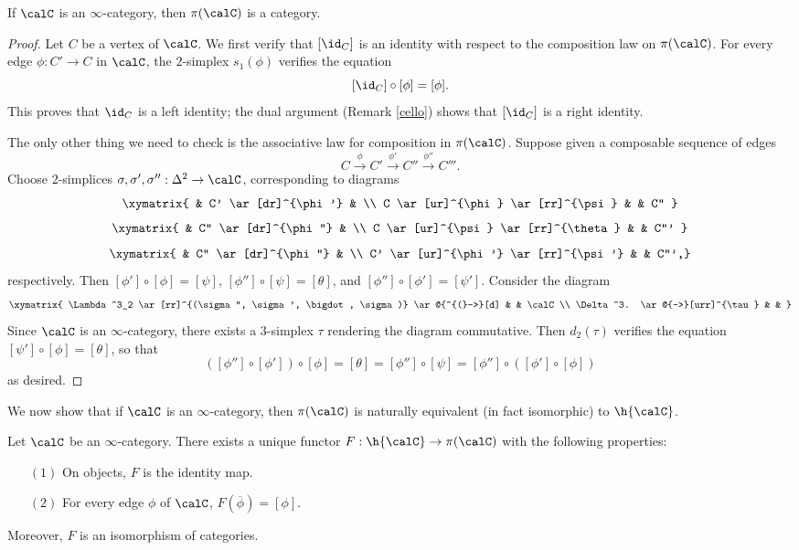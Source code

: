 \begin{proposition}
If $\calC$ is an $\infty$-category, then $\pi(\calC)$ is a category.
\end{proposition}

\begin{proof}
Let $C$ be a vertex of $\calC$. We first verify that $[\id_{C}]$ is an identity with respect to the composition law on $\pi(\calC)$. For every edge $\phi: C' \rightarrow C$ in $\calC$, the
$2$-simplex $s_1(\phi)$ verifies the equation
$$ [ \id_{C} ] \circ [\phi] = [\phi].$$
This proves that $\id_{C}$ is a left
identity; the dual argument (Remark \ref{cello}) shows that $[\id_{C}]$ is a right
identity.

The only other thing we need to check is the associative law for
composition in $\pi(\calC)$. Suppose given a composable sequence of edges
$$ C \stackrel{\phi}{\rightarrow} C' \stackrel{\phi'}{\rightarrow} C'' \stackrel{\phi''}{\rightarrow} C'''.$$
Choose $2$-simplices $\sigma, \sigma', \sigma'': \Delta^2 \rightarrow \calC$, corresponding to diagrams
$$ \xymatrix{ & C' \ar[dr]^{\phi'} & \\
C \ar[ur]^{\phi} \ar[rr]^{\psi} & & C'' }$$
$$ \xymatrix{ & C'' \ar[dr]^{\phi''} & \\
C \ar[ur]^{\psi} \ar[rr]^{\theta} & & C''' }$$
$$ \xymatrix{ & C'' \ar[dr]^{\phi''} & \\
C' \ar[ur]^{\phi'} \ar[rr]^{\psi'} & & C''',}$$
respectively. Then $[\phi'] \circ [\phi] = [\psi]$, $[\phi''] \circ [\psi] = [\theta]$, and
$[\phi''] \circ [\phi'] = [\psi']$. Consider the diagram
$$ \xymatrix{
\Lambda^3_2 \ar[rr]^{(\sigma'', \sigma', \bigdot, \sigma)} \ar@{^{(}->}[d] & & \calC \\
\Delta^3. \ar@{-->}[urr]^{\tau} & & }$$
Since $\calC$ is an $\infty$-category, there exists a $3$-simplex $\tau$ rendering the diagram commutative. Then $d_2(\tau)$ verifies the equation
$[\psi'] \circ [\phi] = [\theta]$, so that
$$([\phi''] \circ [\phi']) \circ [\phi] = [\theta] = [\phi''] \circ
[\psi] = [\phi''] \circ ([\phi'] \circ [\phi])$$ as desired.
\end{proof}

We now show that if $\calC$ is an $\infty$-category, then $\pi(\calC)$ is
naturally equivalent (in fact isomorphic) to $\h{\calC}$.

\begin{proposition}
Let $\calC$ be an $\infty$-category. There exists a unique functor $F: \h{\calC} \rightarrow \pi(\calC)$ with the following properties:
\begin{itemize}
\item[$(1)$] On objects, $F$ is the identity map.
\item[$(2)$] For every edge $\phi$ of $\calC$, $F( \overline{\phi} ) = [\phi]$.
\end{itemize}
Moreover, $F$ is an isomorphism of categories.
\end{proposition}

